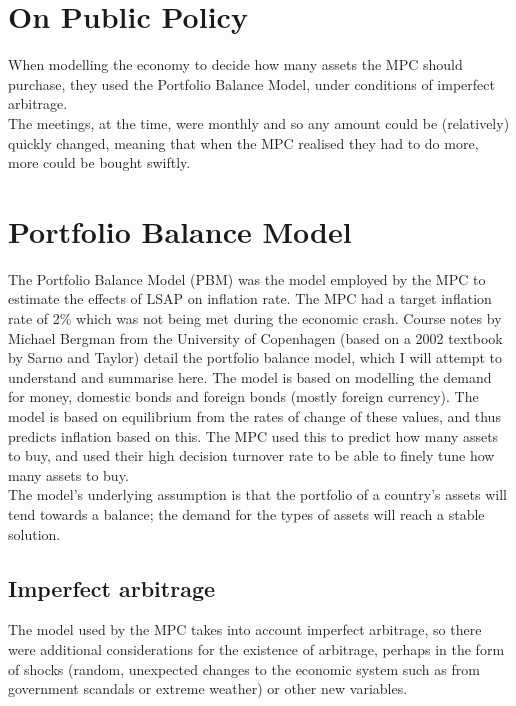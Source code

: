 \documentclass[notitlepage,12pt]{report}
\begin{document}
\section{On Public Policy}

When modelling the economy to decide how many assets the MPC should purchase, they used the Portfolio Balance Model, under conditions of imperfect arbitrage.\\
The meetings, at the time, were monthly and so any amount could be (relatively) quickly changed, meaning that when the MPC realised they had to do more, more could be bought swiftly.

\section{Portfolio Balance Model}

The Portfolio Balance Model (PBM) was the model employed by the MPC to estimate the effects of LSAP on inflation rate. The MPC had a target inflation rate of 2\%\cite[p.1]{noauthor_quantitative_nodate} which was not being met during the economic crash.\cite{noauthor_united_nodate} Course notes by Michael Bergman\cite{bergman_portfolio_2005} from the University of Copenhagen (based on a 2002 textbook by Sarno and Taylor\cite{sarno_economics_2002}) detail the portfolio balance model, which I will attempt to understand and summarise here. The model is based on modelling the demand for money, domestic bonds and foreign bonds (mostly foreign currency). The model is based on equilibrium from the rates of change of these values, and thus predicts inflation based on this. The MPC used this to predict how many assets to buy, and used their high decision turnover rate to be able to finely tune how many assets to buy.\\
The model's underlying assumption is that the portfolio of a country's assets will tend towards a balance; the demand for the types of assets will reach a stable solution.

\subsection{Imperfect arbitrage}

The model used by the MPC takes into account imperfect arbitrage, so there were additional considerations for the existence of arbitrage, perhaps in the form of shocks (random, unexpected changes to the economic system such as from government scandals or extreme weather) or other new variables.
\end{document}

